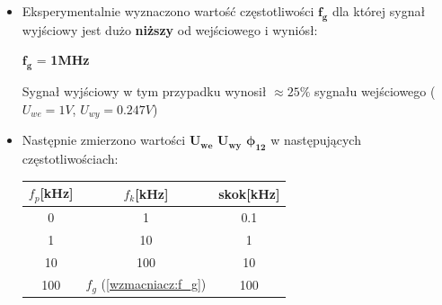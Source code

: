 \begin{itemize}
    \item Eksperymentalnie wyznaczono wartość częstotliwości $\mathbf{f_g}$ dla której sygnał wyjściowy jest dużo \textbf{niższy} od wejściowego i wyniósł:
        \begin{center}
            \label{wzmacniacz:f_g} $\mathbf{f_g}$ = \textbf{1MHz}
        \end{center}
    Sygnał wyjściowy w tym przypadku wynosił $\approx 25\%$ sygnału wejściowego ($U_{we} = 1V$, $U_{wy} = 0.247V$)
    \item Następnie zmierzono wartości $\mathbf{U_{we}}$ $\mathbf{U_{wy}}$ $\mathbf{\boldsymbol{\phi}_{12}}$ w następujących częstotliwościach:
    \begin{center}
        \Large
        \begin{tabular}{|c|c|c|}
            \hline
            $f_p$[kHz] & $f_k$[kHz] & skok[kHz] \\
            \hline
            0 & 1 & 0.1 \\
            \hline
            1 & 10 & 1 \\
            \hline
            10 & 100 & 10 \\
            \hline
            100 & $f_g$ (\ref{wzmacniacz:f_g}) & 100 \\
            \hline
        \end{tabular}
    \end{center}
    

\end{itemize}
